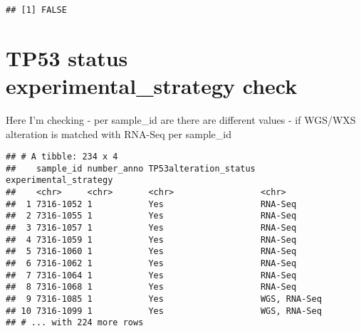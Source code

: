 \documentclass[]{article}
\newenvironment{Shaded}{\begin{snugshade}}{\end{snugshade}}
\newcommand{\KeywordTok}[1]{\textcolor[rgb]{0.13,0.29,0.53}{\textbf{#1}}}
\newcommand{\DataTypeTok}[1]{\textcolor[rgb]{0.13,0.29,0.53}{#1}}
\newcommand{\StringTok}[1]{\textcolor[rgb]{0.31,0.60,0.02}{#1}}
\newcommand{\OperatorTok}[1]{\textcolor[rgb]{0.81,0.36,0.00}{\textbf{#1}}}
\newcommand{\NormalTok}[1]{#1}
\begin{document}
\begin{verbatim}
## [1] FALSE
\end{verbatim}

\section{TP53 status experimental\_strategy
check}\label{tp53-status-experimental_strategy-check}

Here I'm checking - per sample\_id are there are different values - if
WGS/WXS alteration is matched with RNA-Seq per sample\_id

\begin{Shaded}
\end{Shaded}

\begin{verbatim}
## # A tibble: 234 x 4
##    sample_id number_anno TP53alteration_status experimental_strategy
##    <chr>     <chr>       <chr>                 <chr>                
##  1 7316-1052 1           Yes                   RNA-Seq              
##  2 7316-1055 1           Yes                   RNA-Seq              
##  3 7316-1057 1           Yes                   RNA-Seq              
##  4 7316-1059 1           Yes                   RNA-Seq              
##  5 7316-1060 1           Yes                   RNA-Seq              
##  6 7316-1062 1           Yes                   RNA-Seq              
##  7 7316-1064 1           Yes                   RNA-Seq              
##  8 7316-1068 1           Yes                   RNA-Seq              
##  9 7316-1085 1           Yes                   WGS, RNA-Seq         
## 10 7316-1099 1           Yes                   WGS, RNA-Seq         
## # ... with 224 more rows
\end{verbatim}
\end{document}
